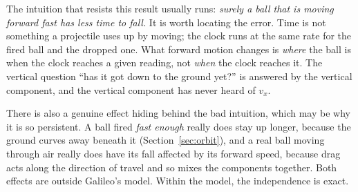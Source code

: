 \documentclass[11pt,twoside,openany]{book}
\begin{document}
\begin{modelnote}
The intuition that resists this result usually runs: \emph{surely a ball that is moving forward fast has less time to fall.} It is worth locating the error. Time is not something a projectile uses up by moving; the clock runs at the same rate for the fired ball and the dropped one. What forward motion changes is \emph{where} the ball is when the clock reaches a given reading, not \emph{when} the clock reaches it. The vertical question ``has it got down to the ground yet?'' is answered by the vertical component, and the vertical component has never heard of $v_x$.

There is also a genuine effect hiding behind the bad intuition, which may be why it is so persistent. A ball fired \emph{fast enough} really does stay up longer, because the ground curves away beneath it (Section~\ref{sec:orbit}), and a real ball moving through air really does have its fall affected by its forward speed, because drag acts along the direction of travel and so mixes the components together. Both effects are outside Galileo's model. Within the model, the independence is exact.
\end{modelnote}
\end{document}
